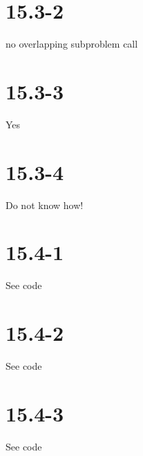 \documentclass[]{article}
\begin{document}
\section{15.3-2}
no overlapping subproblem call

\section{15.3-3}
Yes

\section{15.3-4}
Do not know how!

\section{15.4-1}
See code

\section{15.4-2}
See code

\section{15.4-3}
See code
\end{document}

